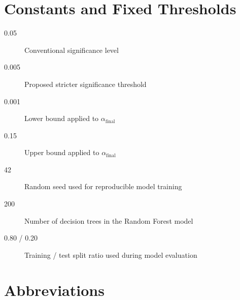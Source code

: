 \section*{Constants and Fixed Thresholds}

\begin{description}
	
	\item[0.05] Conventional significance level
	
	\item[0.005] Proposed stricter significance threshold
	
	\item[0.001] Lower bound applied to $\alpha_{\text{final}}$
	
	\item[0.15] Upper bound applied to $\alpha_{\text{final}}$
	
	\item[42] Random seed used for reproducible model training
	
	\item[200] Number of decision trees in the Random Forest model
	
	\item[0.80 / 0.20] Training / test split ratio used during model evaluation
	
\end{description}

\section*{Abbreviations}

